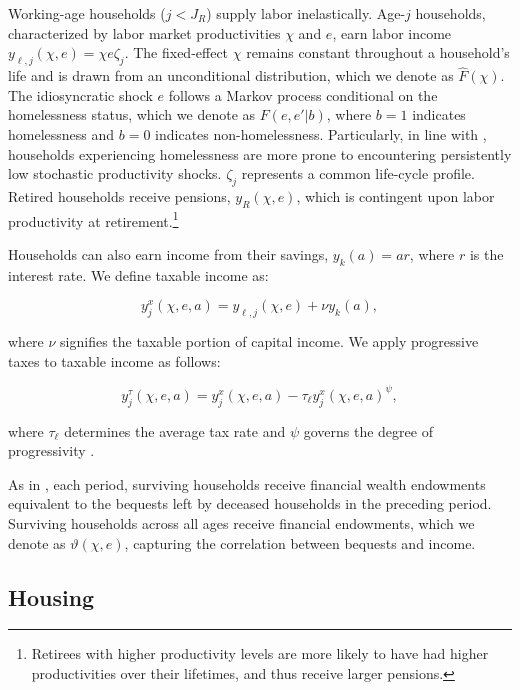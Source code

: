 \documentclass[parskip=full]{article}
\begin{document}
Working-age households ($j<J_{R}$) supply labor inelastically. Age-$j$ households, characterized by labor market productivities $\chi$ and $e$, earn labor income $y_{\ell,j}(\chi,e)=\chi e\zeta_j$. The fixed-effect $\chi$ remains constant throughout a household's life and is drawn from an unconditional distribution, which we denote as $\hat{F}(\chi)$. The idiosyncratic shock $e$ follows a Markov process conditional on the homelessness status, which we denote as $F(e,e'|b)$, where $b=1$ indicates homelessness and $b=0$ indicates non-homelessness. Particularly, in line with \citet{az-2024}, households experiencing homelessness are more prone to encountering persistently low stochastic productivity shocks. $\zeta_j$ represents a common life-cycle profile. Retired households receive pensions, $y_{R}(\chi,e)$, which is contingent upon labor productivity at retirement.\footnote{Retirees with higher productivity levels are more likely to have had higher productivities over their lifetimes, and thus receive larger pensions.}

Households can also earn income from their savings, $y_{k}(a)=ar$, where $r$ is the interest rate. We define taxable income as:

\begin{equation*}\label{eq:taxable_labor_income}
  y^{x}_{j}(\chi,e,a) =y_{\ell,j}(\chi,e)+\nu y_{k}(a),
\end{equation*}

\noindent where $\nu$ signifies the taxable portion of capital income. We apply progressive taxes to taxable income as follows:

\begin{equation}\label{eq:income_tax}
  y^{\tau}_{j}(\chi,e,a) = y^{x}_{j}(\chi,e,a)-\tau_{\ell}y^{x}_{j}(\chi,e,a)^{\psi},
\end{equation}

\noindent where $\tau_{\ell}$ determines the average tax rate and $\psi$ governs the degree of progressivity \citep{hsv-2020}.

As in \citet{kkk-2021}, each period, surviving households receive financial wealth endowments equivalent to the bequests left by deceased households in the preceding period. Surviving households across all ages receive financial endowments, which we denote as $\vartheta (\chi,e)$, capturing the correlation between bequests and income.

\subsection{Housing}\label{subsection:housing_choice}
\end{document}
